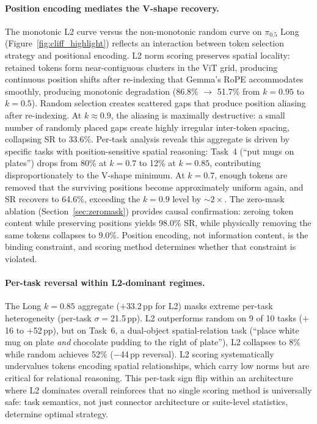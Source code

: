 \paragraph{Position encoding mediates the V-shape recovery.}
The monotonic L2 curve versus the non-monotonic random curve on $\pi_{0.5}$ Long (Figure~\ref{fig:cliff_highlight}) reflects an interaction between token selection strategy and positional encoding. L2 norm scoring preserves spatial locality: retained tokens form near-contiguous clusters in the ViT grid, producing continuous position shifts after re-indexing that Gemma's RoPE accommodates smoothly, producing monotonic degradation (86.8\% $\to$ 51.7\% from $k{=}0.95$ to $k{=}0.5$). Random selection creates scattered gaps that produce position aliasing after re-indexing. At $k{\approx}0.9$, the aliasing is maximally destructive: a small number of randomly placed gaps create highly irregular inter-token spacing, collapsing SR to 33.6\%. Per-task analysis reveals this aggregate is driven by specific tasks with position-sensitive spatial reasoning: Task~4 (``put mugs on plates'') drops from 80\% at $k{=}0.7$ to 12\% at $k{=}0.85$, contributing disproportionately to the V-shape minimum. At $k{=}0.7$, enough tokens are removed that the surviving positions become approximately uniform again, and SR recovers to 64.6\%, exceeding the $k{=}0.9$ level by ${\sim}2{\times}$. The zero-mask ablation (Section~\ref{sec:zeromask}) provides causal confirmation: zeroing token content while preserving positions yields 98.0\% SR, while physically removing the same tokens collapses to 9.0\%. Position encoding, not information content, is the binding constraint, and scoring method determines whether that constraint is violated.

\paragraph{Per-task reversal within L2-dominant regimes.} The Long $k{=}0.85$ aggregate ($+$33.2\,pp for L2) masks extreme per-task heterogeneity (per-task $\sigma{=}$21.5\,pp). L2 outperforms random on 9 of 10 tasks ($+$16 to $+$52\,pp), but on Task~6, a dual-object spatial-relation task (``place white mug on plate \emph{and} chocolate pudding to the right of plate''), L2 collapses to 8\% while random achieves 52\% ($-$44\,pp reversal). L2 scoring systematically undervalues tokens encoding spatial relationships, which carry low norms but are critical for relational reasoning. This per-task sign flip within an architecture where L2 dominates overall reinforces that no single scoring method is universally safe: task semantics, not just connector architecture or suite-level statistics, determine optimal strategy.

